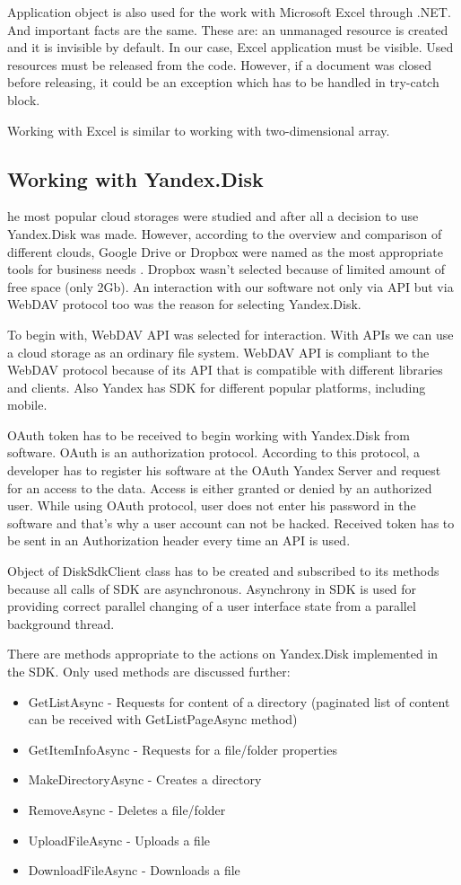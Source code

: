 \documentclass[12pt,journal,compsoc]{D:/Магистратура/English/bare_conf/IEEEtran}
\begin{document}
Application object is also used for the work with Microsoft Excel through .NET. And important facts are the same. These are: an unmanaged resource is created and it is invisible by default. In our case, Excel application must be visible. Used resources must be released from the code. However, if a document was closed before releasing, it could be an exception which has to be handled in try-catch block.

Working with Excel is similar to working with two-dimensional array.

\subsection{Working with Yandex.Disk}
he most popular cloud storages were studied and after all a decision to use Yandex.Disk was made. However, according to the overview and comparison of different clouds, Google Drive or Dropbox were named as the most appropriate tools for business needs . Dropbox wasn’t  selected because of limited amount of free space (only 2Gb). An interaction with our software not only via API but via WebDAV protocol too was the reason for selecting Yandex.Disk.

To begin with, WebDAV API was selected for interaction. With APIs we can use a cloud storage as an ordinary file system. WebDAV API is compliant to the WebDAV protocol because of its API that is compatible with different libraries and clients. Also Yandex has SDK for different popular platforms, including mobile.

OAuth token has to be received to begin working with Yandex.Disk from software. OAuth is an authorization protocol. According to this protocol, a developer has to register his software at the OAuth Yandex Server and request for an access to the data. Access is either granted or denied by an authorized user. While using OAuth protocol, user does not enter his password in the software and that’s why a user account can not be hacked. Received token has to be sent in an Authorization header every time an API is used.

Object of DiskSdkClient class has to be created and subscribed to its methods because all calls of SDK are asynchronous. Asynchrony in SDK is used for providing correct parallel changing of a user interface state from a parallel background thread.

There are methods appropriate to the actions on Yandex.Disk implemented in the SDK. Only used methods are discussed further:
\begin{itemize}
\item GetListAsync - Requests for content of a directory (paginated list of content can be received with GetListPageAsync method)
\item GetItemInfoAsync - Requests for a file/folder properties
\item MakeDirectoryAsync - Creates a directory
\item RemoveAsync - Deletes a file/folder
\item UploadFileAsync - Uploads a file
\item DownloadFileAsync - Downloads a file
\end{itemize}
\end{document}
